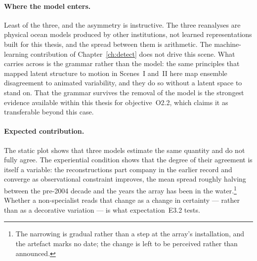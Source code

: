 \paragraph{Where the model enters.} Least of the three, and the asymmetry is instructive. The three reanalyses are physical ocean models produced by other institutions, not learned representations built for this thesis, and the spread between them is arithmetic. The machine-learning contribution of Chapter~\ref{ch:detect} does not drive this scene. What carries across is the grammar rather than the model: the same principles that mapped latent structure to motion in Scenes~I and~II here map ensemble disagreement to animated variability, and they do so without a latent space to stand on. That the grammar survives the removal of the model is the strongest evidence available within this thesis for objective~O2.2, which claims it as transferable beyond this case.
 
\paragraph{Expected contribution.} The static plot shows that three models estimate the same quantity and do not fully agree. The experiential condition shows that the degree of their agreement is itself a variable: the reconstructions part company in the earlier record and converge as observational constraint improves, the mean spread roughly halving between the pre-2004 decade and the years the array has been in the water.\footnote{The narrowing is gradual rather than a step at the array's installation, and the artefact marks no date; the change is left to be perceived rather than announced.} Whether a non-specialist reads that change as a change in certainty --- rather than as a decorative variation --- is what expectation~E3.2 tests.

